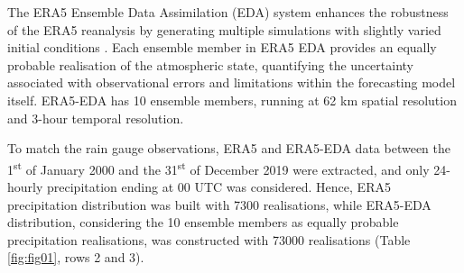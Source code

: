 \documentclass{ametsocV6.1}
\begin{document}
The ERA5 Ensemble Data Assimilation (EDA) system enhances the robustness of the ERA5 reanalysis by generating multiple simulations with slightly varied initial conditions \citep{Hersbach2020}. Each ensemble member in ERA5 EDA provides an equally probable realisation of the atmospheric state, quantifying the uncertainty associated with observational errors and limitations within the forecasting model itself. ERA5-EDA has 10 ensemble members, running at 62 km spatial resolution and 3-hour temporal resolution.

To match the rain gauge observations, ERA5 and ERA5-EDA data between the 1\textsuperscript{st} of January 2000 and the 31\textsuperscript{st} of December 2019 were extracted, and only 24-hourly precipitation ending at 00 UTC was considered. Hence, ERA5 precipitation distribution was built with 7300 realisations, while ERA5-EDA distribution, considering the 10 ensemble members as equally probable precipitation realisations, was constructed with 73000 realisations (Table \ref{fig:fig01}, rows 2 and 3).
\end{document}
